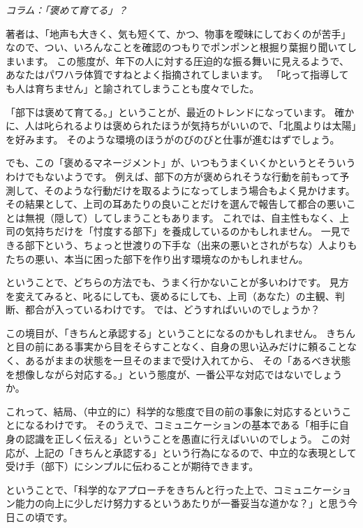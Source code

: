 \documentclass[uplatex,dvipdfmx,a4paper,11pt]{jsarticle}
\begin{document}
\begin{longartdeco}
	\begin{center}
	\emph{コラム：「褒めて育てる」？}	
	\end{center}

	著者は、「地声も大きく、気も短くて、かつ、物事を曖昧にしておくのが苦手」なので、つい、いろんなことを確認のつもりでポンポンと根掘り葉掘り聞いてしまいます。
	この態度が、年下の人に対する圧迫的な振る舞いに見えるようで、あなたはパワハラ体質ですねとよく指摘されてしまいます。
	「叱って指導しても人は育ちません」と諭されてしまうことも度々でした。
	
	「部下は褒めて育てる。」ということが、最近のトレンドになっています。
	確かに、人は叱られるよりは褒められたほうが気持ちがいいので、「北風よりは太陽」を好みます。
	そのような環境のほうがのびのびと仕事が進むはずでしょう。
	
	でも、この「褒めるマネージメント」が、いつもうまくいくかというとそういうわけでもないようです。
	例えば、部下の方が褒められそうな行動を前もって予測して、そのような行動だけを取るようになってしまう場合もよく見かけます。
	その結果として、上司の耳あたりの良いことだけを選んで報告して都合の悪いことは無視（隠して）してしまうこともあります。
	これでは、自主性もなく、上司の気持ちだけを「忖度する部下」を養成しているのかもしれません。
	一見できる部下という、ちょっと世渡りの下手な（出来の悪いとされがちな）人よりもたちの悪い、本当に困った部下を作り出す環境なのかもしれません。
	
	ということで、どちらの方法でも、うまく行かないことが多いわけです。
	見方を変えてみると、叱るにしても、褒めるにしても、上司（あなた）の主観、判断、都合が入っているわけです。
	では、どうすればいいのでしょうか？
	
	この境目が、「きちんと承認する」ということになるのかもしれません。
	きちんと目の前にある事実から目をそらすことなく、自身の思い込みだけに頼ることなく、あるがままの状態を一旦そのままで受け入れてから、
	その「あるべき状態を想像しながら対応する。」という態度が、一番公平な対応ではないでしょうか。
	
	これって、結局、（中立的に）科学的な態度で目の前の事象に対応するということになるわけです。
	そのうえで、コミュニケーションの基本である「相手に自身の認識を正しく伝える」ということを愚直に行えばいいのでしょう。
	この対応が、上記の「きちんと承認する」という行為になるので、中立的な表現として受け手（部下）にシンプルに伝わることが期待できます。
	
	ということで、「科学的なアプローチをきちんと行った上で、コミュニケーション能力の向上に少しだけ努力するというあたりが一番妥当な道かな？」と思う今日この頃です。


\end{longartdeco}
\end{document}
